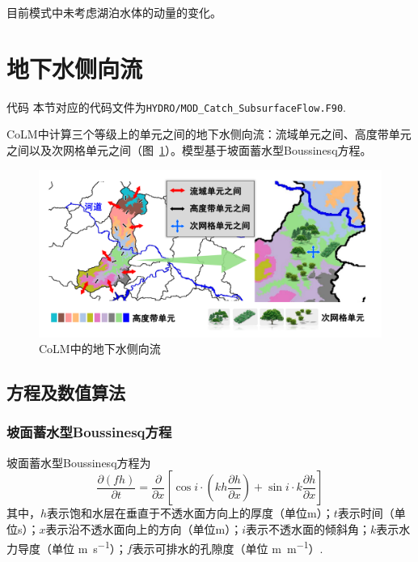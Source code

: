目前模式中未考虑湖泊水体的动量的变化。

\section{地下水侧向流}

\begin{mymdframed}{代码}
  本节对应的代码文件为\texttt{HYDRO/MOD\_Catch\_SubsurfaceFlow.F90}.
\end{mymdframed}

CoLM中计算三个等级上的单元之间的地下水侧向流：流域单元之间、高度带单元之间以及次网格单元之间（图~\ref{fig:地下水侧向流}）。模型基于坡面蓄水型Boussinesq方程。

{
  \begin{figure}[htbp]
    \centering
    \includegraphics[width=\textwidth]{Figures/侧向流/地下水侧向流.pdf}
    \caption{CoLM中的地下水侧向流}
    \label{fig:地下水侧向流}
  \end{figure}
}

\subsection{方程及数值算法}
\subsubsection{坡面蓄水型Boussinesq方程}
坡面蓄水型Boussinesq方程为
\begin{equation}
  \frac{\partial \left(fh\right)}{\partial t} = \frac{\partial}{\partial x} \left[\cos i \cdot \left(kh\frac{\partial h}{\partial x}\right)+\sin i\cdot k\frac{\partial h}{\partial x}\right]
\end{equation}
其中，$h$表示饱和水层在垂直于不透水面方向上的厚度（单位m）；$t$表示时间（单位s）；$x$表示沿不透水面向上的方向（单位m）；$i$表示不透水面的倾斜角；$k$表示水力导度（单位 \unit{m.s^{-1}}）；$f$表示可排水的孔隙度（单位 \unit{m.m^{-1}}）.

